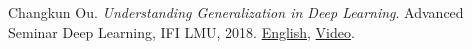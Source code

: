     \item{
      Changkun Ou.
      \emph{Understanding Generalization in Deep Learning}.
      Advanced Seminar Deep Learning, IFI LMU, 2018. \href{https://docs.google.com/presentation/d/1eNUYH9_3bbBO7bONPU8BCTr2DOMC69gdOJvBgpLjwNg/edit#slide=id.g2cdf1dbd0b_1_6}{English}, \href{https://www.youtube.com/watch?v=z9je5YlnBgI&t=1585s}{Video}.
    }
\resumeSubHeadingListEnd
